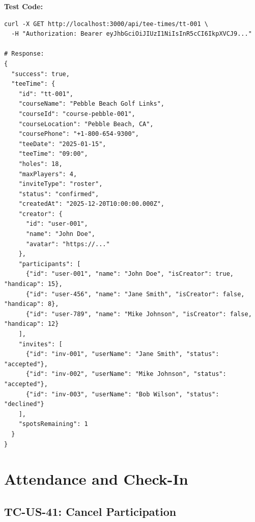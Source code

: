 \documentclass[11pt,a4paper]{article}
\begin{document}
\vspace{0.3cm}
\textbf{Test Code:}
\begin{lstlisting}
curl -X GET http://localhost:3000/api/tee-times/tt-001 \
  -H "Authorization: Bearer eyJhbGciOiJIUzI1NiIsInR5cCI6IkpXVCJ9..."

# Response:
{
  "success": true,
  "teeTime": {
    "id": "tt-001",
    "courseName": "Pebble Beach Golf Links",
    "courseId": "course-pebble-001",
    "courseLocation": "Pebble Beach, CA",
    "coursePhone": "+1-800-654-9300",
    "teeDate": "2025-01-15",
    "teeTime": "09:00",
    "holes": 18,
    "maxPlayers": 4,
    "inviteType": "roster",
    "status": "confirmed",
    "createdAt": "2025-12-20T10:00:00.000Z",
    "creator": {
      "id": "user-001",
      "name": "John Doe",
      "avatar": "https://..."
    },
    "participants": [
      {"id": "user-001", "name": "John Doe", "isCreator": true, "handicap": 15},
      {"id": "user-456", "name": "Jane Smith", "isCreator": false, "handicap": 8},
      {"id": "user-789", "name": "Mike Johnson", "isCreator": false, "handicap": 12}
    ],
    "invites": [
      {"id": "inv-001", "userName": "Jane Smith", "status": "accepted"},
      {"id": "inv-002", "userName": "Mike Johnson", "status": "accepted"},
      {"id": "inv-003", "userName": "Bob Wilson", "status": "declined"}
    ],
    "spotsRemaining": 1
  }
}
\end{lstlisting}

\newpage


\section{Attendance and Check-In}

\subsection{TC-US-41: Cancel Participation}
\end{document}
